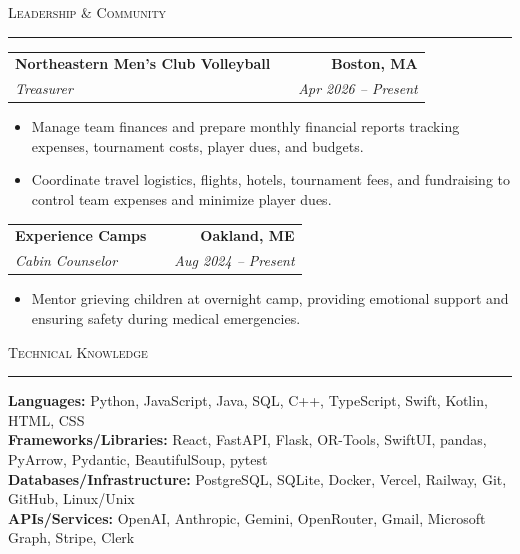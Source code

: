 \documentclass[letterpaper,10pt]{article}
\makeatletter
\newcommand{\header}[1]{\par\vspace{6pt}\textsc{#1}\par\nobreak\vspace{1pt}\hrule\vspace{4pt}}
\newcommand{\role}[4]{%
  \begin{tabularx}{\textwidth}{@{}lXr@{}}
    \textbf{#1} & & \textbf{#2} \\
    \textit{#3} & & \textit{#4} \\
  \end{tabularx}\vspace{-3pt}%
}
\makeatother
\begin{document}
\header{Leadership \& Community}
\role{Northeastern Men's Club Volleyball}{Boston, MA}{Treasurer}{Apr 2026 -- Present}
\begin{itemize}
  \item Manage team finances and prepare monthly financial reports tracking expenses, tournament costs, player dues, and budgets.
  \item Coordinate travel logistics, flights, hotels, tournament fees, and fundraising to control team expenses and minimize player dues.
\end{itemize}
\vspace{1pt}
\role{Experience Camps}{Oakland, ME}{Cabin Counselor}{Aug 2024 -- Present}
\begin{itemize}
  \item Mentor grieving children at overnight camp, providing emotional support and ensuring safety during medical emergencies.
\end{itemize}

\header{Technical Knowledge}
\textbf{Languages:} Python, JavaScript, Java, SQL, C++, TypeScript, Swift, Kotlin, HTML, CSS\\
\textbf{Frameworks/Libraries:} React, FastAPI, Flask, OR-Tools, SwiftUI, pandas, PyArrow, Pydantic, BeautifulSoup, pytest\\
\textbf{Databases/Infrastructure:} PostgreSQL, SQLite, Docker, Vercel, Railway, Git, GitHub, Linux/Unix\\
\textbf{APIs/Services:} OpenAI, Anthropic, Gemini, OpenRouter, Gmail, Microsoft Graph, Stripe, Clerk
\end{document}
